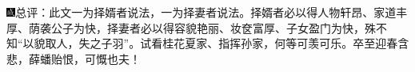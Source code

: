 {\includegraphics[width=3mm]{../Images/00005}\kaishu 总评：此文一为择婿者说法，一为择妻者说法。择婿者必以得人物轩昂、家道丰厚、荫袭公子为快，择妻者必以得容貌艳丽、妆奁富厚、子女盈门为快，殊不知“以貌取人，失之子羽”。试看桂花夏家、指挥孙家，何等可羡可乐。卒至迎春含悲，薛蟠贻恨，可慨也夫！}


